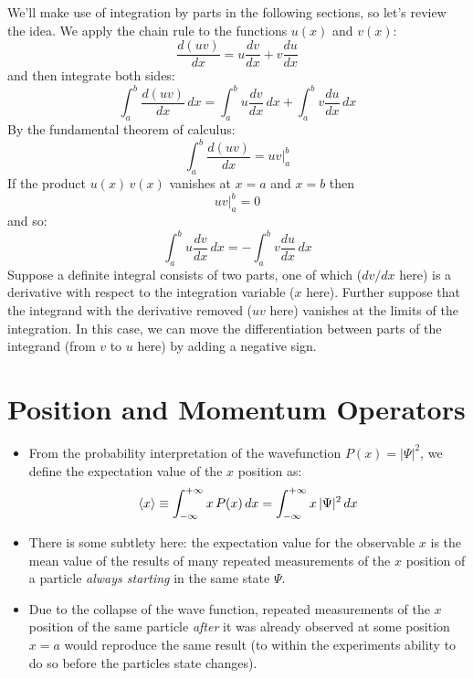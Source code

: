 \documentclass[12pt]{book}
\begin{document}
We'll make use of integration by parts in the following sections, so let's review the idea.  We apply the chain rule to the functions $u(x)$ and $v(x)$:
$$\frac{d(uv)}{dx} = u\frac{dv}{dx} + v\frac{du}{dx}$$
and then integrate both sides:
$$\int_a^b\frac{d(uv)}{dx} \, dx = \int_a^b u \frac{dv}{dx} \, dx + \int_a^bv\frac{du}{dx} \, dx$$
By the fundamental theorem of calculus:
$$\int_a^b\frac{d(uv)}{dx} = \left. uv \right\rvert_{a}^{b}$$
If the product $u(x)\,v(x)$ vanishes at $x = a$ and $x = b$ then
$$\left.uv \right\rvert_{a}^{b} = 0$$
and so:
\begin{equation}
\label{eqn:intparts}
\int_{a}^{b} u \frac{dv}{dx} \, dx =  - \int_{a}^{b} v \frac{du}{dx} \, dx
\end{equation}
Suppose a definite integral consists of two parts, one of which ($dv/dx$ here) is a derivative with respect to the integration variable ($x$ here).  Further suppose that the integrand with the derivative removed ($uv$ here) vanishes at the limits of the integration.  In this case, we can move the differentiation between parts of the integrand (from $v$ to $u$ here) by adding a negative sign.

\section{Position and Momentum Operators}
\begin{itemize}
\item  From the probability interpretation of the wavefunction $P(x) = | \Psi | ^2$, we define the expectation value of the $x$ position as:
$$\braket{x} \equiv \int_{-\infty}^{+\infty} x \, P(x) \,dx = \int_{-\infty}^{+\infty} x \, |\Psi|^2 \,dx$$
\item There is some subtlety here: the expectation value for the observable $x$ is the mean value of the results of many repeated measurements of the $x$ position of a particle {\em always starting} in the same state $\Psi$.  
\item Due to the collapse of the wave function, repeated measurements of the $x$ position of the same particle {\em after} it was already observed at some position $x=a$ would reproduce the same result (to within the experiments ability to do so before the particles state changes).
\end{itemize}
\end{document}
